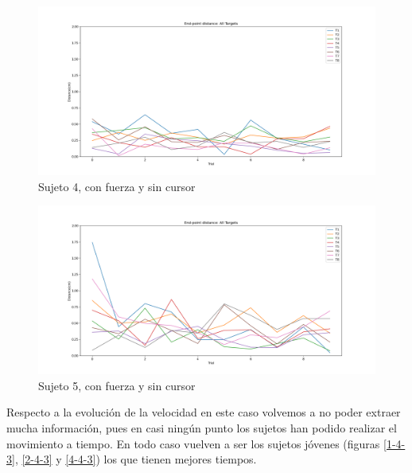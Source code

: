 \documentclass[a4paper,11pt, oneside]{book}
\begin{document}
\begin{figure}[H]
	\includegraphics[width=\linewidth]{sujeto4/force_no_cursor/evolution_distance}
	\caption{Sujeto 4, con  fuerza y sin cursor}
	\label{4-4-2}
\end{figure}
\begin{figure}[H]
	\includegraphics[width=\linewidth]{sujeto5/force_no_cursor/evolution_distance}
	\caption{Sujeto 5, con  fuerza y sin cursor}
	\label{5-4-2}
\end{figure}


Respecto a la evolución de la velocidad en este caso volvemos a no poder extraer mucha información, pues en casi ningún punto los sujetos han podido realizar el movimiento a tiempo. En todo caso vuelven a ser los sujetos jóvenes (figuras \ref{1-4-3}, \ref{2-4-3} y \ref{4-4-3}) los que tienen mejores tiempos.
\end{document}
